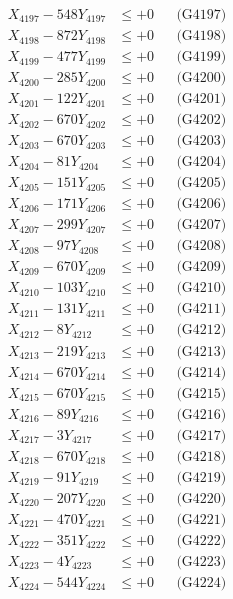 \documentclass[a4paper,10pt]{article}
\begin{document}
{\begin{align}
X_{4197} - 548Y_{4197} &\leq +0 && \text{(G4197)} \\
X_{4198} - 872Y_{4198} &\leq +0 && \text{(G4198)} \\
X_{4199} - 477Y_{4199} &\leq +0 && \text{(G4199)} \\
X_{4200} - 285Y_{4200} &\leq +0 && \text{(G4200)} \\
\allowbreak
X_{4201} - 122Y_{4201} &\leq +0 && \text{(G4201)} \\
X_{4202} - 670Y_{4202} &\leq +0 && \text{(G4202)} \\
X_{4203} - 670Y_{4203} &\leq +0 && \text{(G4203)} \\
X_{4204} - 81Y_{4204} &\leq +0 && \text{(G4204)} \\
X_{4205} - 151Y_{4205} &\leq +0 && \text{(G4205)} \\
X_{4206} - 171Y_{4206} &\leq +0 && \text{(G4206)} \\
X_{4207} - 299Y_{4207} &\leq +0 && \text{(G4207)} \\
X_{4208} - 97Y_{4208} &\leq +0 && \text{(G4208)} \\
X_{4209} - 670Y_{4209} &\leq +0 && \text{(G4209)} \\
X_{4210} - 103Y_{4210} &\leq +0 && \text{(G4210)} \\
\allowbreak
X_{4211} - 131Y_{4211} &\leq +0 && \text{(G4211)} \\
X_{4212} - 8Y_{4212} &\leq +0 && \text{(G4212)} \\
X_{4213} - 219Y_{4213} &\leq +0 && \text{(G4213)} \\
X_{4214} - 670Y_{4214} &\leq +0 && \text{(G4214)} \\
X_{4215} - 670Y_{4215} &\leq +0 && \text{(G4215)} \\
X_{4216} - 89Y_{4216} &\leq +0 && \text{(G4216)} \\
X_{4217} - 3Y_{4217} &\leq +0 && \text{(G4217)} \\
X_{4218} - 670Y_{4218} &\leq +0 && \text{(G4218)} \\
X_{4219} - 91Y_{4219} &\leq +0 && \text{(G4219)} \\
X_{4220} - 207Y_{4220} &\leq +0 && \text{(G4220)} \\
\allowbreak
X_{4221} - 470Y_{4221} &\leq +0 && \text{(G4221)} \\
X_{4222} - 351Y_{4222} &\leq +0 && \text{(G4222)} \\
X_{4223} - 4Y_{4223} &\leq +0 && \text{(G4223)} \\
X_{4224} - 544Y_{4224} &\leq +0 && \text{(G4224)} \\

\end{align}}
\end{document}
